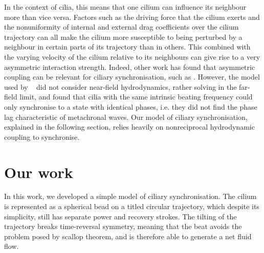 In the context of cilia, this means that one cilium can influence its neighbour more than vice versa. Factors such as the driving force that the cilium exerts and the nonuniformity of internal and external drag coefficients over the cilium trajectory can all make the cilium more susceptible to being perturbed by a neighbour in certain parts of its trajectory than in others. This combined with the varying velocity of the cilium relative to its neighbours can give rise to a very asymmetric interaction strength. Indeed, other work has found that asymmetric coupling can be relevant for ciliary synchronisation, such as . However, the model used by \citeauthor*{niedermayer_synchronization_2008}~\cite{niedermayer_synchronization_2008} did not consider near-field hydrodynamics, rather solving in the far-field limit, and found that cilia with the same intrinsic beating frequency could only synchronise to a state with identical phases, i.e. they did not find the phase lag characteristic of metachronal waves. Our model of ciliary synchronisation, explained in the following section, relies heavily on nonreciprocal hydrodynamic coupling to synchronise.


\section{Our work}
In this work, we developed a simple model of ciliary synchronisation. The cilium is represented as a spherical bead on a titled circular trajectory, which despite its simplicity, still has separate power and recovery strokes. The tilting of the trajectory breaks time-reversal symmetry, meaning that the beat avoids the problem posed by scallop theorem, and is therefore able to generate a net fluid flow.

